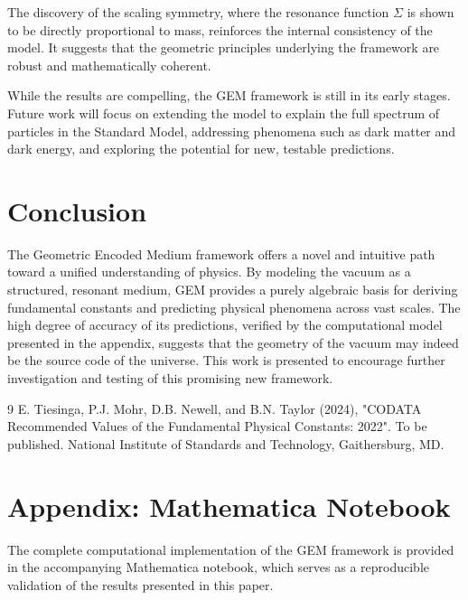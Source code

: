 \documentclass[12pt]{article}
\begin{document}
The discovery of the scaling symmetry, where the resonance function $\Sigma$ is shown to be directly proportional to mass, reinforces the internal consistency of the model. It suggests that the geometric principles underlying the framework are robust and mathematically coherent.

While the results are compelling, the GEM framework is still in its early stages. Future work will focus on extending the model to explain the full spectrum of particles in the Standard Model, addressing phenomena such as dark matter and dark energy, and exploring the potential for new, testable predictions.

\section{Conclusion}

The Geometric Encoded Medium framework offers a novel and intuitive path toward a unified understanding of physics. By modeling the vacuum as a structured, resonant medium, GEM provides a purely algebraic basis for deriving fundamental constants and predicting physical phenomena across vast scales. The high degree of accuracy of its predictions, verified by the computational model presented in the appendix, suggests that the geometry of the vacuum may indeed be the source code of the universe. This work is presented to encourage further investigation and testing of this promising new framework.

\begin{thebibliography}{9}
    E. Tiesinga, P.J. Mohr, D.B. Newell, and B.N. Taylor (2024), "CODATA Recommended Values of the Fundamental Physical Constants: 2022". To be published. National Institute of Standards and Technology, Gaithersburg, MD.
    
    
\end{thebibliography}

\appendix
\section{Appendix: Mathematica Notebook}
The complete computational implementation of the GEM framework is provided in the accompanying Mathematica notebook, which serves as a reproducible validation of the results presented in this paper.
\end{document}
